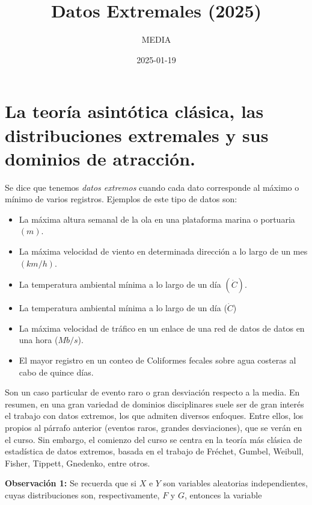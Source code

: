 \documentclass[
]{book}
\title{Datos Extremales (2025)}
\author{MEDIA}
\date{2025-01-19}
\providecommand{\tightlist}{%
  \setlength{\itemsep}{0pt}\setlength{\parskip}{0pt}}
\theoremstyle{definition}
\theoremstyle{definition}
\theoremstyle{definition}
\theoremstyle{definition}
\theoremstyle{remark}
\begin{document}
\maketitle

{
\setcounter{tocdepth}{1}
\tableofcontents
}
\chapter{La teoría asintótica clásica, las distribuciones extremales y sus dominios de atracción.}\label{la-teoruxeda-asintuxf3tica-cluxe1sica-las-distribuciones-extremales-y-sus-dominios-de-atracciuxf3n.}

Se dice que tenemos \emph{datos extremos} cuando cada
dato corresponde al máximo o mínimo de varios
registros. Ejemplos de este tipo de datos son:

\begin{itemize}
\tightlist
\item
  La máxima altura semanal de la ola en una
  plataforma marina o portuaria \((m)\).
\item
  La máxima velocidad de viento en determinada
  dirección a lo largo de un mes \((km/h)\).
\item
  La temperatura ambiental mínima a lo largo de
  un día \((\dot{C})\).
\item
  La temperatura ambiental mínima a lo largo de
  un día (\(\dot{C}\))
\item
  La máxima velocidad de tráfico en un enlace de
  una red de datos de datos en una hora (\(Mb/s\)).
\item
  El mayor registro en un conteo de Coliformes
  fecales sobre agua costeras al cabo de quince días.
\end{itemize}

Son un caso particular de evento raro o gran
desviación respecto a la media.
En resumen, en una gran variedad de dominios
disciplinares suele ser de gran interés el trabajo
con datos extremos, los que admiten diversos
enfoques. Entre ellos, los propios al párrafo
anterior (eventos raros, grandes desviaciones), que
se verán en el curso.
Sin embargo, el comienzo del curso se centra en la
teoría más clásica de estadística de datos extremos,
basada en el trabajo de Fréchet, Gumbel, Weibull,
Fisher, Tippett, Gnedenko, entre otros.

\textbf{Observación 1:} Se recuerda que si \(X\) e \(Y\) son variables aleatorias independientes, cuyas
distribuciones son, respectivamente, \(F\) y \(G\),
entonces la variable
\end{document}
